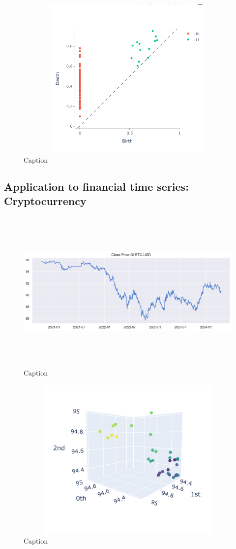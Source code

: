 \documentclass{article}
\begin{document}
\begin{figure}[h!]
    \centering
    \includegraphics[width= 12cm, height = 8cm]{PD sin with gaussian noise.png}
    \caption{Caption}
    \label{fig:enter-label}
\end{figure}
\clearpage

\subsection{Application to financial time series: Cryptocurrency}
\begin{figure}[h!]
    \centering
    \includegraphics[width= 12cm, height = 8cm]{price BTC.png}
    \caption{Caption}
    \label{fig:enter-label}
\end{figure}


\begin{figure}[h!]
    \centering
    \includegraphics[width= 16cm, height = 8cm]{PC BTC.png}
    \caption{Caption}
    \label{fig:enter-label}
\end{figure}
\end{document}
